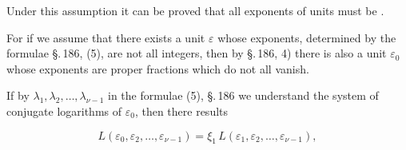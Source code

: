 Under this assumption it can be proved that
all exponents of units must be .

For if we assume that there exists a unit $\varepsilon$
whose exponents, determined by the formulae \S.\,186, (5), are not
all integers, then by \S.\,186, 4) there is also a
unit $\varepsilon_0$ whose exponents are proper fractions which do not all
vanish.

If by $\lambda_1, \lambda_2, \ldots, \lambda_{\nu-1}$ in the formulae (5),
\S.\,186 we understand the system of conjugate logarithms of $\varepsilon_0$, then there
 results

\[
L(\varepsilon_0, \varepsilon_2, \ldots, \varepsilon_{\nu-1}) = \xi_1\, L(\varepsilon_1, \varepsilon_2, \ldots, \varepsilon_{\nu-1}),
\]
